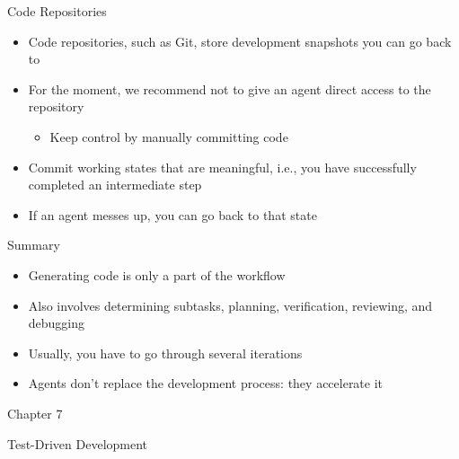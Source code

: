 \documentclass[
ps,
]{prosper}
\begin{document}
\begin{slide}{Code Repositories}

\begin{itemize}

\item Code repositories, such as Git, store development snapshots you can go
  back to

\item For the moment, we recommend not to give an agent direct access to the
  repository

  \begin{itemize}
  
  \item Keep control by manually committing code

  \end{itemize}

\item Commit working states that are meaningful, i.e., you have successfully
  completed an intermediate step

\item If an agent messes up, you can go back to that state
  
\end{itemize}
  
\end{slide}



\begin{slide}{Summary}

\begin{itemize}

\item Generating code is only a part of the workflow

\item Also involves determining subtasks, planning, verification, reviewing, and
  debugging

\item Usually, you have to go through several iterations
  
\item Agents don't replace the development process: they accelerate it

\end{itemize}
  
\end{slide}





\begin{slide}{Chapter 7}

\vspace*{2cm}

\begin{center}
\begin{Huge}
Test-Driven Development
\end{Huge}
\end{center}

\end{slide}
\end{document}
